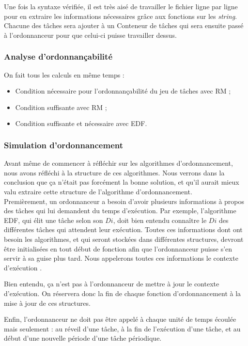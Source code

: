 				Une fois la syntaxe vérifiée, il est très aisé de travailler le fichier ligne par ligne pour en extraire les informations nécessaires grâce aux fonctions sur les \emph{string}. Chacune des tâches sera ajouter à un Conteneur de tâches qui sera ensuite passé à l'ordonnanceur pour que celui-ci puisse travailler dessus.
			
			\subsubsection{Analyse d'ordonnançabilité}
				On fait tous les calculs en même temps :
				\begin{itemize}
					\item Condition nécessaire pour l'ordonnançabilité du jeu de tâches avec RM ;
					\item Condition suffisante avec RM ;
					\item Condition suffisante et nécessaire avec EDF.
				\end{itemize}
		
			\subsubsection{Simulation d'ordonnancement}

				Avant même de commencer à réfléchir sur les algorithmes d'ordonnancement, nous avons réfléchi à la structure de ces algorithmes. Nous verrons dans la conclusion que ça n'était pas forcément la bonne solution, et qu'il aurait mieux valu extraire cette structure de l'algorithme d'ordonnancement.\\
				
				Premièrement, un ordonnanceur a besoin d'avoir plusieurs informations à propos des tâches qui lui demandent du temps d'exécution. Par exemple, l'algorithme EDF, qui élit une tâche selon son $Di$, doit bien entendu connaître le $Di$ des différentes tâches qui attendent leur exécution. Toutes ces informations dont ont besoin les algorithmes, et qui seront stockées dans différentes structures, devront être initialisées en tout début de fonction afin que l'ordonnanceur puisse s'en servir à sa guise plus tard. Nous appelerons toutes ces informations le \og contexte d'exécution \fg.
				
				Bien entendu, ça n'est pas à l'ordonnanceur de mettre à jour le contexte d'exécution. On réservera donc la fin de chaque fonction d'ordonnancement à la mise à jour de ces structures.
				
				Enfin, l'ordonnanceur ne doit pas être appelé à chaque unité de temps écoulée mais seulement : au réveil d'une tâche, à la fin de l'exécution d'une tâche, et au début d'une nouvelle période d'une tâche périodique.\\
				
